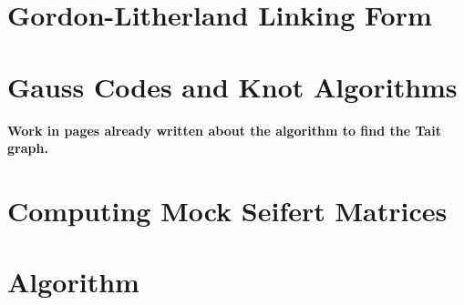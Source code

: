 \documentclass[12pt]{report}
\newcommand{\notered}[1]{{\color{Red} \textbf{#1}}}
\begin{document}
\chapter{Gordon-Litherland Linking Form}

\chapter{Gauss Codes and Knot Algorithms}
\notered{Work in pages already written about the algorithm to find the Tait graph.}


\chapter{Computing Mock Seifert Matrices}

\newpage
\printbibliography[title=References]


\appendix
{}
\titlespacing*{\chapter}{0pt}{40pt}{30pt}

\chapter{Algorithm}
\end{document}

